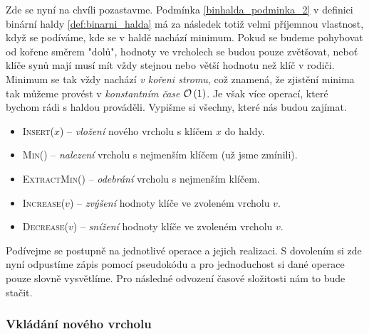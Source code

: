 Zde se nyní na chvíli pozastavme. Podmínka \ref{binhalda_podminka_2} v definici binární haldy \ref{def:binarni_halda} má za následek totiž velmi příjemnou vlastnost, když se podíváme, kde se v haldě nachází minimum. Pokud se budeme pohybovat od kořene směrem "dolů", hodnoty ve vrcholech se budou pouze zvětšovat, neboť klíče synů mají musí mít vždy stejnou nebo větší hodnotu než klíč v rodiči. Minimum se tak vždy nachází \emph{v kořeni stromu}, což znamená, že zjistění minima tak můžeme provést v \emph{konstantním čase} $\mathcal{O}\left(1\right)$.
Je však více operací, které bychom rádi s haldou prováděli. Vypišme si všechny, které nás budou zajímat.
\begin{itemize}
    \item \textsc{Insert}($x$) -- \emph{vložení} nového vrcholu s klíčem $x$ do haldy.
    \item \textsc{Min}() -- \emph{nalezení} vrcholu s nejmenším klíčem (už jsme zmínili).
    \item \textsc{ExtractMin}() -- \emph{odebrání} vrcholu s nejmenším klíčem.
    \item \textsc{Increase}($v$) -- \emph{zvýšení} hodnoty klíče ve zvoleném vrcholu $v$.
    \item \textsc{Decrease}($v$) -- \emph{snížení} hodnoty klíče ve zvoleném vrcholu $v$.
\end{itemize}

Podívejme se postupně na jednotlivé operace a jejich realizaci. S dovolením si zde nyní odpustíme zápis pomocí pseudokódu a pro jednoduchost si dané operace pouze slovně vysvětlíme. Pro následné odvození časové složitosti nám to bude stačit.

\subsubsection{Vkládání nového vrcholu}

